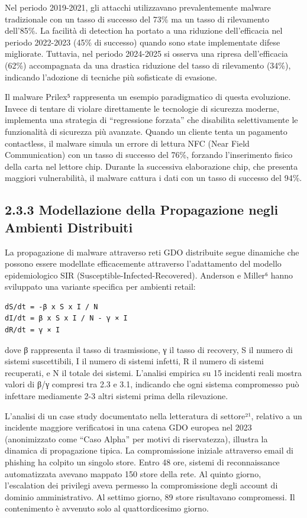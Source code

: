 \documentclass[12pt,a4paper,oneside]{book}
\numberwithin{figure}{chapter} %
\numberwithin{table}{chapter}  %
\begin{document}
Nel periodo 2019-2021, gli attacchi utilizzavano prevalentemente malware
tradizionale con un tasso di successo del 73\% ma un tasso di
rilevamento dell'85\%. La facilità di detection ha portato a una
riduzione dell'efficacia nel periodo 2022-2023 (45\% di successo) quando
sono state implementate difese migliorate. Tuttavia, nel periodo
2024-2025 si osserva una ripresa dell'efficacia (62\%) accompagnata da
una drastica riduzione del tasso di rilevamento (34\%), indicando
l'adozione di tecniche più sofisticate di evasione.

Il malware Prilex⁵ rappresenta un esempio paradigmatico di questa
evoluzione. Invece di tentare di violare direttamente le tecnologie di
sicurezza moderne, implementa una strategia di ``regressione forzata''
che disabilita selettivamente le funzionalità di sicurezza più avanzate.
Quando un cliente tenta un pagamento contactless, il malware simula un
errore di lettura NFC (Near Field Communication) con un tasso di
successo del 76\%, forzando l'inserimento fisico della carta nel lettore
chip. Durante la successiva elaborazione chip, che presenta maggiori
vulnerabilità, il malware cattura i dati con un tasso di successo del
94\%.

\subsection{2.3.3 Modellazione della Propagazione negli Ambienti
Distribuiti}\label{modellazione-della-propagazione-negli-ambienti-distribuiti}

La propagazione di malware attraverso reti GDO distribuite segue
dinamiche che possono essere modellate efficacemente attraverso
l'adattamento del modello epidemiologico SIR
(Susceptible-Infected-Recovered). Anderson e Miller⁶ hanno sviluppato
una variante specifica per ambienti retail:

\begin{verbatim}
dS/dt = -β x S x I / N
dI/dt = β x S x I / N - γ × I
dR/dt = γ × I
\end{verbatim}

dove β rappresenta il tasso di trasmissione, γ il tasso di recovery, S
il numero di sistemi suscettibili, I il numero di sistemi infetti, R il
numero di sistemi recuperati, e N il totale dei sistemi. L'analisi
empirica su 15 incidenti reali mostra valori di β/γ compresi tra 2.3 e
3.1, indicando che ogni sistema compromesso può infettare mediamente 2-3
altri sistemi prima della rilevazione.

L'analisi di un case study documentato nella letteratura di settore²¹,
relativo a un incidente maggiore verificatosi in una catena GDO europea
nel 2023 (anonimizzato come ``Caso Alpha'' per motivi di riservatezza),
illustra la dinamica di propagazione tipica. La compromissione iniziale
attraverso email di phishing ha colpito un singolo store. Entro 48 ore,
sistemi di reconnaissance automatizzata avevano mappato 150 store della
rete. Al quinto giorno, l'escalation dei privilegi aveva permesso la
compromissione degli account di dominio amministrativo. Al settimo
giorno, 89 store risultavano compromessi. Il contenimento è avvenuto
solo al quattordicesimo giorno.
\end{document}

